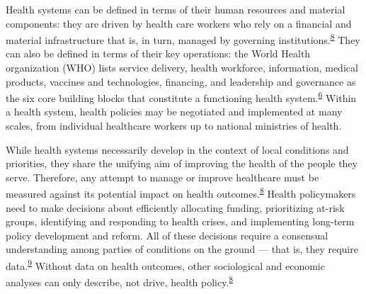 \documentclass[
]{article}
\begin{document}
Health systems can be defined in terms of their human resources and material components: they are driven by health care workers who rely on a financial and material infrastructure that is, in turn, managed by governing institutions.\textsuperscript{\protect\hyperlink{ref-Roberts2008}{8}} They can also be defined in terms of their key operations: the World Health organization (WHO) lists service delivery, health workforce, information, medical products, vaccines and technologies, financing, and leadership and governance as the six core building blocks that constitute a functioning health system.\textsuperscript{\protect\hyperlink{ref-WorldHealthOrganization2007}{6}} Within a health system, health policies may be negotiated and implemented at many scales, from individual healthcare workers up to national ministries of health.

While health systems necessarily develop in the context of local conditions and priorities, they share the unifying aim of improving the health of the people they serve. Therefore, any attempt to manage or improve healthcare must be measured against its potential impact on health outcomes.\textsuperscript{\protect\hyperlink{ref-Roberts2008}{8}} Health policymakers need to make decisions about efficiently allocating funding, prioritizing at-risk groups, identifying and responding to health crises, and implementing long-term policy development and reform. All of these decisions require a consensual understanding among parties of conditions on the ground --- that is, they require data.\textsuperscript{\protect\hyperlink{ref-AbouZahr2015}{9}} Without data on health outcomes, other sociological and economic analyses can only describe, not drive, health policy.\textsuperscript{\protect\hyperlink{ref-Roberts2008}{8}}
\end{document}
